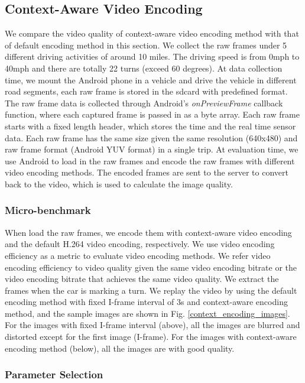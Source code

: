 \subsection{Context-Aware Video Encoding}

We compare the video quality of context-aware video encoding method 
with that of default encoding method in this section. 
We collect the raw frames under 5 different driving activities
of around 10 miles. 
The driving speed is from 0mph to 40mph and there are totally 22 
turns (exceed 60 degrees). 
At data collection time, we mount the Android phone in a vehicle
and drive the vehicle in different road segments, 
each raw frame is stored in the sdcard with predefined format. 
The raw frame data is collected through Android's \emph{onPreviewFrame}
callback function, where each captured frame is passed in 
as a byte array. 
Each raw frame starts with a fixed length header, which stores
the time and the real time sensor data. 
Each raw frame has the same size given the same resolution (640x480)
and raw frame format (Android YUV format) in a single trip. 
At evaluation time, we use Android to load in the raw frames
and encode the raw frames with different video encoding methods. 
The encoded frames are sent to the server to convert back
to the video, which is used to calculate the image quality. 


\subsubsection{Micro-benchmark}
\label{mico_context}

When load the raw frames, we encode them with context-aware video encoding
and the default H.264 video encoding, respectively. 
We use video encoding efficiency as a metric to evaluate video
encoding methods. 
We refer video encoding efficiency to video quality given the
same video encoding bitrate or the video encoding bitrate that
achieves the same video quality. 
We extract the frames when the car is marking a turn.
We replay the video by using 
the default encoding method with fixed
I-frame interval of 3s
and context-aware encoding method, 
and the sample images are shown in Fig. \ref{context_encoding_images}.
For the images with fixed I-frame
interval (above), 
all the images are blurred and distorted except for the first image (I-frame). 
For the images with context-aware encoding method (below),
all the images are with good quality.  

\subsubsection{Parameter Selection}
\label{sec_selection}


